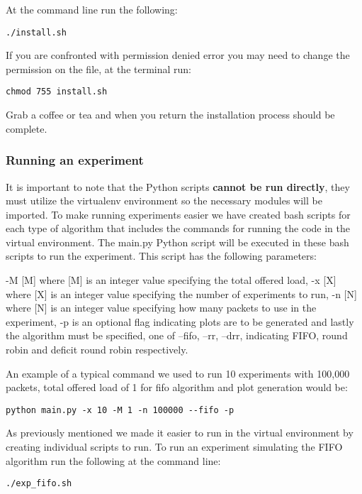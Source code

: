 At the command line run the following:

\begin{lstlisting}
./install.sh
\end{lstlisting}

If you are confronted with permission denied error you may need to change the permission on the file, at the terminal run:

\begin{lstlisting}
chmod 755 install.sh
\end{lstlisting}

Grab a coffee or tea and when you return the installation process should be complete. 

\subsubsection{Running an experiment}
It is important to note that the Python scripts \textbf{cannot be run directly}, they must utilize the virtualenv environment so the necessary modules will be imported. To make running experiments easier we have created bash scripts for each type of algorithm that includes the commands for running the code in the virtual environment. The main.py Python script will be executed in these bash scripts to run the experiment. This script has the following parameters:

-M [M] where [M] is an integer value specifying the total offered load, -x [X] where [X] is an integer value specifying the number of experiments to run, -n [N] where [N] is an integer value specifying how many packets to use in the experiment, -p is an optional flag indicating plots are to be generated and lastly the algorithm must be specified, one of --fifo, --rr, --drr, indicating FIFO, round robin and deficit round robin respectively.

An example of a typical command we used to run 10 experiments with 100,000 packets, total offered load of 1 for fifo algorithm and plot generation would be:

\begin{verbatim}
python main.py -x 10 -M 1 -n 100000 --fifo -p
\end{verbatim}

As previously mentioned we made it easier to run in the virtual environment by creating individual scripts to run. To run an experiment simulating the FIFO algorithm run the following at the command line:

\begin{lstlisting}
./exp_fifo.sh
\end{lstlisting}

